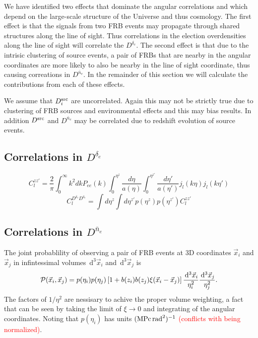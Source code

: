 \documentclass[onecolumn,prd,noshowpacs,nofootinbib,amsmath,amssymb]{revtex4}
\newcommand{\Dne}{D^{\bar{n}_e}}
\newcommand{\Dde}{D^{\delta_e}}
\newcommand{\Dsrc}{D^{\rm src}}
\newcommand{\calP}{{\cal P}}
\newcommand{\ud}{\,\mathrm{d}}
\newcommand{\red}{\textcolor{red}}
\begin{document}
We have identified two effects that dominate the angular
correlations and which depend on the large-scale structure of the Universe and
thus cosmology.  The first effect is that the signals from two FRB events may
propagate through shared structures along the line of sight.  Thus correlations
in the election overdensities along the line of sight will correlate the 
$\Dde$.  The second effect is that due to the intrisic clustering of source
events, a pair of FRBs that are nearby in the angular coordinates are more
likely to also be nearby in the line of sight coordinate, thus causing
correations in $\Dne$.  In the remainder of this section we will calculate the
contributions from each of these effects.

We assume that $D^{\rm src}_i$ are uncorrelated. Again this may not
be strictly true due to clustering of FRB sources and environmental effects
and this may bias results.  In addition $\Dsrc$ and $\Dne$ may be correlated due
to redshift evolution of source events.


\subsection{Correlations in $\Dde$}

\begin{equation}
C_l^{zz'}=\frac{2}{\pi} \int_0^{\infty}k^2 dk P_{ee}(k) \int_0^{\eta^z}\frac{d\eta}{a(\eta)} \int_0^{\eta^{z'}}\frac{d\eta'}{a(\eta')}  j_l(k\eta) j_l(k\eta')
\end{equation}
\begin{equation}
C_l^{\Dde \Dde} = \int d\eta^z \int d\eta^{z'} p(\eta^z)p(\eta^{z'}) C_l^{z z'}
\end{equation}


\subsection{Correlations in $\Dne$}

The joint probablility of observing a pair of FRB events at 3D coordinates
$\vec x_i$ and $\vec x_j$ in infintessimal volumes $\ud^3\vec x_i$ and
$\ud^3\vec x_j$ is
\begin{equation}
    \calP(\vec x_i, \vec x_j) = p(\eta_i) p(\eta_j) \left[ 1 + b(z_i)
    b(z_j) \xi(\vec x_i - \vec x_j) \right] \frac{\ud^3\vec x_i}{\eta_i^2}
    \frac{\ud^3\vec x_j}{\eta_j^2}.
\end{equation}
The factors of $1/\eta^2$ are nessisary to achive the proper volume weighting,
a fact that can be seen by taking the limit of $\xi \to 0$ and integrating of
the angular coordinates. Noting that $p(\eta_i)$ has units 
\red{$({\rm MPc}\,{\rm rad}^2)^{-1}$ (conflicts with being normalized)}.
\end{document}
